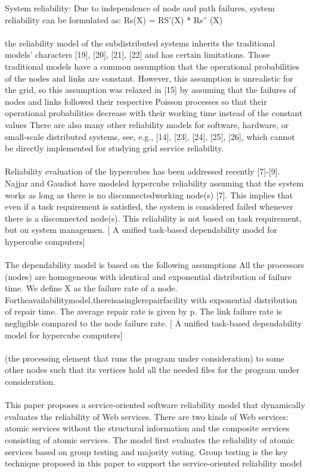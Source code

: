 \documentclass{cslthse-msc}
\begin{document}
System reliability: Due to independence of node and path failures, system reliability can be formulated as: Rs(X) = RS’(X) * Rs” (X) \cite{optTaskAllocationForMaxRel}
\\\\
the reliability model of the subdistributed systems inherits the traditional models’ characters [19], [20], [21], [22] and has certain limitations. Those traditional models have a common assumption that the operational probabilities of the nodes and links are constant. However, this assumption is unrealistic for the grid, so this assumption was relaxed in [15] by assuming that the failures of nodes and links followed their respective Poisson processes so that their operational probabilities decrease with their working time instead of the constant values 
There are also many other reliability models for software, hardware, or small-scale distributed systems, see, e.g., [14], [23], [24], [25], [26], which cannot be directly implemented for studying grid service reliability. \cite{hierarchicalRelModeling}
\\\\
Reliability evaluation of the hypercubes has been addressed recently [7]-[9]. Najjar and Gaudiot have modeled hypercube reliability assuming that the system works as long as there is no disconnectedworking node(s) [7]. This implies that even if a task requirement is satisfied, the system is considered failed whenever there is a disconnected node(s). This reliability is not based on task requirement, but on system managemen.  [ A unified task-based dependability model for hypercube computers]
\\\\
The dependability model is based on the following assumptions All the processors (nodes) are homogeneous with identical and exponential distribution of failure time. We define X as the failure rate of a node. Fortheavailabilitymodel,thereisasinglerepairfacility with exponential distribution of repair time. The average repair rate is given by p.
The link failure rate is negligible compared to the node failure rate. [ A unified task-based dependability model for hypercube computers]
\\\\
(the processing element that runs the program under consideration) to some other nodes such that its vertices hold all the needed files for the program under consideration. \cite{relAnalysisFRA}
\\\\
This paper proposes a service-oriented software reliability model that dynamically evaluates the reliability of Web services. There are two kinds of Web services: atomic services without the structural information and the composite services consisting of atomic services. The model first evaluates the reliability of atomic services based on group testing and majority voting. Group testing is the key technique proposed in this paper to support the service-oriented reliability model \cite{softwareRelModel}
\end{document}
